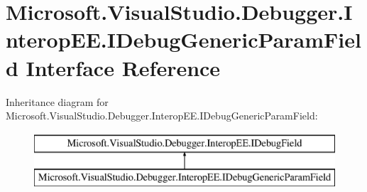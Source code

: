 \hypertarget{interface_microsoft_1_1_visual_studio_1_1_debugger_1_1_interop_e_e_1_1_i_debug_generic_param_field}{\section{Microsoft.\+Visual\+Studio.\+Debugger.\+Interop\+E\+E.\+I\+Debug\+Generic\+Param\+Field Interface Reference}
\label{interface_microsoft_1_1_visual_studio_1_1_debugger_1_1_interop_e_e_1_1_i_debug_generic_param_field}
}
Inheritance diagram for Microsoft.\+Visual\+Studio.\+Debugger.\+Interop\+E\+E.\+I\+Debug\+Generic\+Param\+Field\+:\begin{figure}[H]
\begin{center}
\leavevmode
\includegraphics[height=2.000000cm]{interface_microsoft_1_1_visual_studio_1_1_debugger_1_1_interop_e_e_1_1_i_debug_generic_param_field}
\end{center}
\end{figure}

